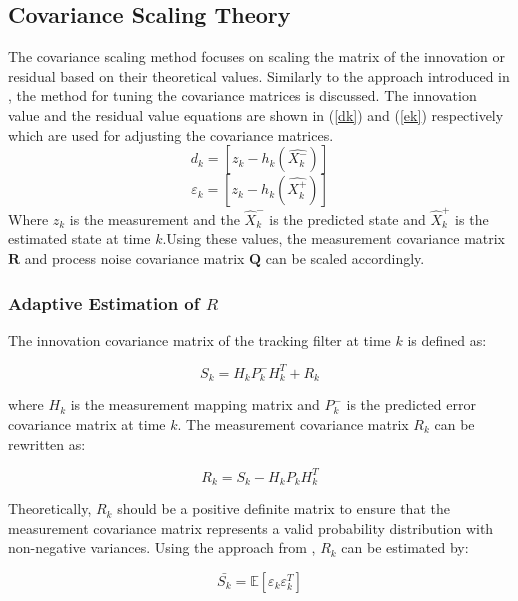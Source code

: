 \subsection{Covariance Scaling Theory}
The covariance scaling method focuses on scaling the matrix of the innovation or residual based on their theoretical values. Similarly to the approach introduced in \cite{Akhlaghi2018}, the method for tuning the covariance matrices is discussed. The innovation value and the residual value equations are shown in (\ref{dk}) and (\ref{ek}) respectively which are used for adjusting the covariance matrices.
\begin{equation}
    d_k = \left[ z_k - h_k(\hat{X^-_k})\right]
    \label{dk}
\end{equation}
\begin{equation}
    \varepsilon_k = \left[ z_k - h_k(\hat{X^+_k})\right]
    \label{ek}
\end{equation}
Where \(z_k\) is the measurement and the \(\hat{X}^-_k\) is the predicted state and  \(\hat{X}^+_k\) is the estimated state at time \(k\).Using these values, the measurement covariance matrix \(\mathbf{R}\) and process noise covariance matrix \(\mathbf{Q}\) can be scaled accordingly.

\subsubsection{Adaptive Estimation of \( R \)}

The innovation covariance matrix of the tracking filter at time \( k \) is defined as:

\begin{equation}
    S_k = H_k P^-_k H^T_k + R_k
\end{equation}

where \( H_k \) is the measurement mapping matrix and \( P^-_k \) is the predicted error covariance matrix at time \( k \). The measurement covariance matrix \( R_k \) can be rewritten as:

\begin{equation}
    R_k = S_k - H_k P_k H^T_k
\end{equation}

Theoretically, \( R_k \) should be a positive definite matrix to ensure that the measurement covariance matrix represents a valid probability distribution with non-negative variances. Using the approach from \cite{wang1999stochastic}, \( R_k \) can be estimated by:

\begin{equation}
    \bar{S_k} = \mathbb{E}\left[ \varepsilon_k \varepsilon_k^T \right] 
    \label{357}
\end{equation}

